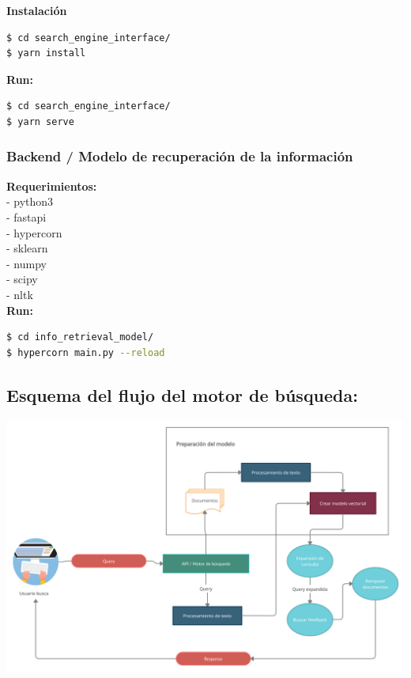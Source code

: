 \documentclass{llncs}
\begin{document}
\textbf{Instalación}
\begin{lstlisting}[language=bash]
$ cd search_engine_interface/
$ yarn install
\end{lstlisting}

\textbf{Run:}
\begin{lstlisting}[language=bash]
$ cd search_engine_interface/
$ yarn serve
\end{lstlisting}

\subsubsection{Backend / Modelo de recuperación de la información} \hfill

\textbf{Requerimientos:} \\
- python3 \\
- fastapi \\
- hypercorn \\
- sklearn \\
- numpy \\
- scipy \\
- nltk \\

\textbf{Run:}
\begin{lstlisting}[language=bash]
$ cd info_retrieval_model/
$ hypercorn main.py --reload
\end{lstlisting}

\subsection{Esquema del flujo del motor de búsqueda:}

\begin{center}
	\includegraphics[scale=0.15]{../application-flow.jpg}\\
\end{center}
\end{document}
